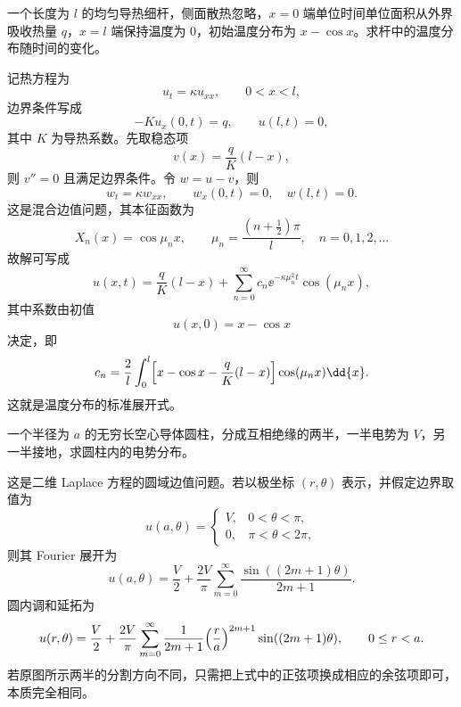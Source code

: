 \begin{question}[导热细杆]

一个长度为 $l$ 的均匀导热细杆，侧面散热忽略，$x=0$ 端单位时间单位面积从外界吸收热量 $q$，$x=l$ 端保持温度为 $0$，初始温度分布为 $x-\cos x$。求杆中的温度分布随时间的变化。

\begin{solution}

记热方程为
\[
 u_t=\kappa u_{xx},\qquad 0<x<l,
\]
边界条件写成
\[
 -K u_x(0,t)=q,\qquad u(l,t)=0,
\]
其中 $K$ 为导热系数。先取稳态项
\[
 v(x)=\frac{q}{K}(l-x),
\]
则 $v''=0$ 且满足边界条件。令 $w=u-v$，则
\[
 w_t=\kappa w_{xx},\qquad w_x(0,t)=0,\quad w(l,t)=0.
\]
这是混合边值问题，其本征函数为
\[
 X_n(x)=\cos\mu_n x,
\qquad \mu_n=\frac{(n+\tfrac12)\pi}{l},\quad n=0,1,2,\dots
\]
故解可写成
\[
 u(x,t)=\frac{q}{K}(l-x)+\sum_{n=0}^{\infty}c_n \ee^{-\kappa\mu_n^2 t}\cos(\mu_n x),
\]
其中系数由初值
\[
 u(x,0)=x-\cos x
\]
决定，即
\[
  c_n=\frac{2}{l}\int_0^l\Bigl[x-\cos x-\frac{q}{K}(l-x)\Bigr]\cos(\mu_n x)\dd{x}.
\]
这就是温度分布的标准展开式。


\end{solution}
\end{question}

\begin{question}[空心导体圆柱的电势]

一个半径为 $a$ 的无穷长空心导体圆柱，分成互相绝缘的两半，一半电势为 $V$，另一半接地，求圆柱内的电势分布。

\begin{solution}

这是二维 Laplace 方程的圆域边值问题。若以极坐标 $(r,\theta)$ 表示，并假定边界取值为
\[
 u(a,\theta)=
 \begin{cases}
 V,&0<\theta<\pi,\\
 0,&\pi<\theta<2\pi,
 \end{cases}
\]
则其 Fourier 展开为
\[
 u(a,\theta)=\frac{V}{2}+\frac{2V}{\pi}\sum_{m=0}^{\infty}
 \frac{\sin( (2m+1)\theta)}{2m+1}.
\]
圆内调和延拓为
\[
 u(r,\theta)=\frac{V}{2}+\frac{2V}{\pi}\sum_{m=0}^{\infty}
 \frac{1}{2m+1}\Bigl(\frac{r}{a}\Bigr)^{2m+1}\sin((2m+1)\theta),
 \qquad 0\le r<a.
\]
若原图所示两半的分割方向不同，只需把上式中的正弦项换成相应的余弦项即可，本质完全相同。


\end{solution}
\end{question}

\clearpage

